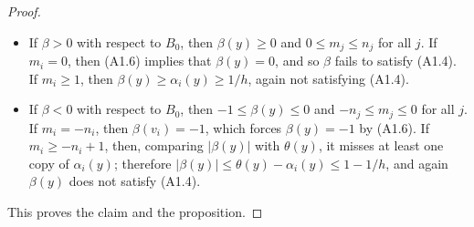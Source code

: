 \documentclass[11pt]{article}
\begin{document}
\begin{proof}
\begin{itemize}[leftmargin=*]
\item If \(\beta>0\) with respect to \(B_0\), then \(\beta(y)\ge0\) and
\(0\le m_j\le n_j\) for all \(j\). If \(m_i=0\), then (A1.6) implies that \(\beta(y)=0\), and
so \(\beta\) fails to satisfy (A1.4). If \(m_i\ge1\), then
\(\beta(y)\ge\alpha_i(y)\ge1/h\), again not satisfying (A1.4).

\item If \(\beta<0\) with respect to \(B_0\), then \(-1\le\beta(y)\le0\) and
\(-n_j\le m_j\le0\) for all \(j\). If \(m_i=-n_i\), then \(\beta(v_i)=-1\), which forces
\(\beta(y)=-1\) by (A1.6). If \(m_i\ge -n_i+1\), then, comparing \(|\beta(y)|\) with
\(\theta(y)\), it misses at least one copy of \(\alpha_i(y)\); therefore
\(|\beta(y)|\le \theta(y)-\alpha_i(y)\le1-1/h\), and again \(\beta(y)\) does not satisfy
(A1.4).
\end{itemize}

This proves the claim and the proposition.
\end{proof}
\end{document}
